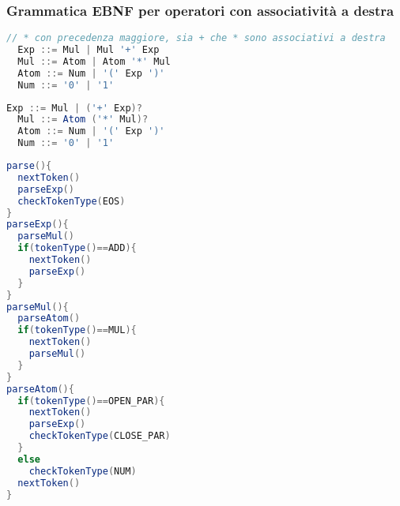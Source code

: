 \subsubsection{Grammatica EBNF per operatori con associatività a destra}
\begin{lstlisting}[language=Java, caption={Grammatica non ambigua}]
  // * con precedenza maggiore, sia + che * sono associativi a destra
  Exp ::= Mul | Mul '+' Exp
  Mul ::= Atom | Atom '*' Mul
  Atom ::= Num | '(' Exp ')'
  Num ::= '0' | '1'
\end{lstlisting}
\begin{lstlisting}[language=Java, caption={Grammatica EBNF equivalente}]
  Exp ::= Mul | ('+' Exp)?
  Mul ::= Atom ('*' Mul)?
  Atom ::= Num | '(' Exp ')'
  Num ::= '0' | '1'
\end{lstlisting}

\begin{lstlisting}[language=Java, caption={Pseudocodice derivato dalla grammatica EBNF precedente}]
parse(){
  nextToken()
  parseExp()
  checkTokenType(EOS)
}
parseExp(){
  parseMul()
  if(tokenType()==ADD){
    nextToken()
    parseExp()
  }
}
parseMul(){
  parseAtom()
  if(tokenType()==MUL){
    nextToken()
    parseMul()
  }
}
parseAtom(){
  if(tokenType()==OPEN_PAR){
    nextToken()
    parseExp()
    checkTokenType(CLOSE_PAR)
  }
  else
    checkTokenType(NUM)
  nextToken()
}
\end{lstlisting}

